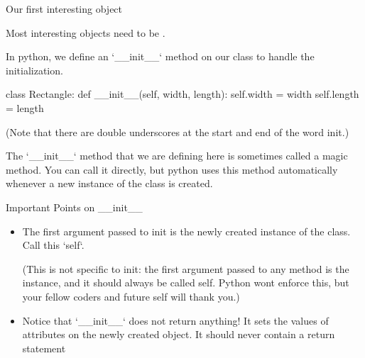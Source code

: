 \documentclass[aspectratio=149, handout] {beamer}
\begin{document}
\begin{frame}[fragile]{Our first interesting object}

  Most interesting objects need to be .

  \pause \medskip

  In python, we define an \inline`__init__` 
  method on our class to handle the initialization.

  \pause \medskip

  \begin{pythoncode}
  class Rectangle:
      def __init__(self, width, length):
          self.width = width
          self.length = length
        
  \end{pythoncode}

  (Note that there are double underscores at the start and end of the word init.)

  \medskip

  The \inline`__init__` method that we are defining here is sometimes called a magic method.  You can call it directly, but python uses this method automatically whenever a new instance of the class is created.
\end{frame}


\begin{frame}[fragile]{Important Points on \_\_init\_\_}

  \begin{itemize}

    \item The first argument passed to init is the newly created instance of the class. Call this \inline`self`.  

    (This is not specific to init: the first argument passed to any method is the instance, and it should always be called self. Python wont enforce this, but your fellow coders and future self will thank you.)

    \bigskip

    \item Notice that \inline`__init__` does not return anything!  It sets the values of attributes on the newly created object.  It should never contain a return statement
  \end{itemize}

\end{frame}
\end{document}
